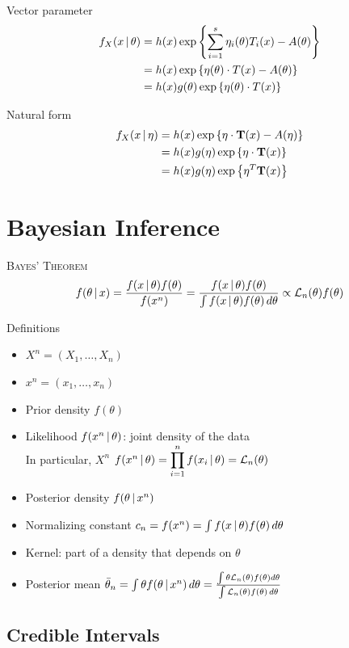 \documentclass[landscape]{article}
\begin{document}
\begin{multicols*}{2}
Vector parameter
\begin{align*}
f_X(x \,|\, \theta)
&= h(x) \exp\left\{\sum_{i=1}^s\eta_i(\theta)T_i(x) - A(\theta)\right\} \\
&= h(x) \exp\left\{\eta(\theta)\cdot T(x) - A(\theta)\right\} \\
&= h(x) g(\theta)\exp\left\{\eta(\theta)\cdot T(x)\right\}
\end{align*}

Natural form
\begin{align*}
f_X(x \,|\, \eta)
&= h(x) \exp\left\{\eta\cdot \mathbf{T}(x) - A(\eta)\right\} \\
&= h(x) g(\eta) \exp\left\{\eta\cdot \mathbf{T}(x)\right\} \\
&= h(x) g(\eta) \exp\left\{\eta^T \mathbf{T}(x)\right\}
\end{align*}

\section{Bayesian Inference}

\textsc{Bayes' Theorem}
\[f(\theta\,|\, x)
= \frac{f(x\,|\,\theta)f(\theta)}{f(x^n)}
= \frac{f(x\,|\,\theta)f(\theta)}
       {\int f(x\,|\,\theta)f(\theta)\,d\theta} \propto \mathcal{L}_n(\theta)f(\theta)\]

Definitions
\begin{itemize}
  \item $X^n = (X_1,\ldots,X_n)$
  \item $x^n = (x_1,\ldots,x_n)$
  \item Prior density $f(\theta)$
  \item Likelihood $f(x^n \,|\, \theta)$: joint density of the data\\
    In particular, $X^n$ \iid \imp $f(x^n\,|\,\theta) =
    \displaystyle\prod_{i=1}^n f(x_i\,|\,\theta) = \mathcal{L}_n(\theta)$
  \item Posterior density $f(\theta\,|\, x^n)$
  \item Normalizing constant $c_n = f(x^n)
    = \int f(x\,|\,\theta)f(\theta)\,d\theta$
  \item Kernel: part of a density that depends on $\theta$
  \item Posterior mean $\bar\theta_n
    = \int\theta f(\theta\,|\, x^n)\,d\theta
    = \frac{\int\theta\mathcal{L}_n(\theta)f(\theta)d\theta}
           {\int\mathcal{L}_n(\theta)f(\theta)\,d\theta}$
\end{itemize}

\subsection{Credible Intervals}


\end{multicols*}
\end{document}
